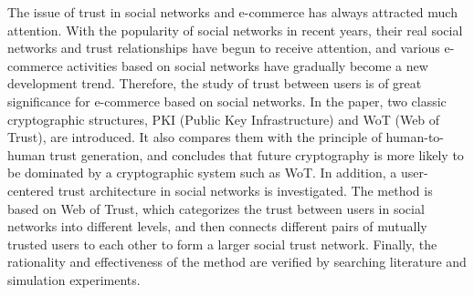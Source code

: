 The issue of trust in social networks and e-commerce has always attracted much attention.
With the popularity of social networks in recent years, their real social networks and 
trust relationships have begun to receive attention, and various e-commerce activities 
based on social networks have gradually become a new development trend. Therefore, the 
study of trust between users is of great significance for e-commerce based on social networks.
In the paper, two classic cryptographic structures, PKI (Public Key Infrastructure) and 
WoT (Web of Trust), are introduced. It also compares them with the principle of human-to-human 
trust generation, and concludes that future cryptography is more likely to be dominated by 
a cryptographic system such as WoT. In addition, a user-centered trust architecture in social 
networks is investigated. The method is based on Web of Trust, which categorizes the trust 
between users in social networks into different levels, and then connects different pairs 
of mutually trusted users to each other to form a larger social trust network. Finally, 
the rationality and effectiveness of the method are verified by searching literature and 
simulation experiments.